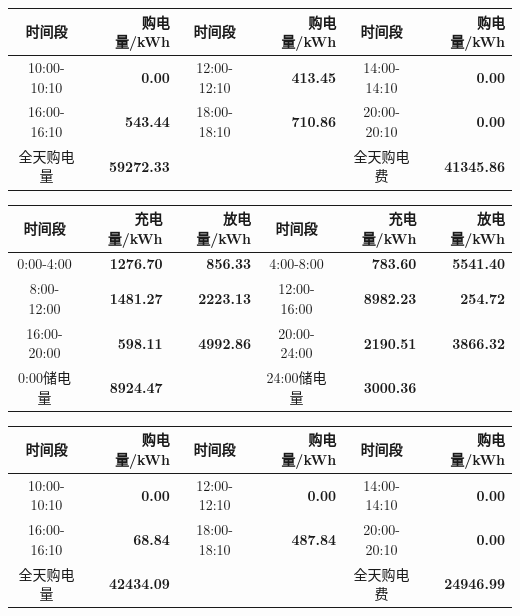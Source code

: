 {\setlength{\tabcolsep}{2pt}
\begin{center}
\begin{tabular}{|c|r|c|r|c|r|}
\hline
时间段 & 购电量/kWh & 时间段 & 购电量/kWh & 时间段 & 购电量/kWh \\
\hline10:00-10:10 & \textbf{0.00} & 12:00-12:10 & \textbf{413.45} & 14:00-14:10 & \textbf{0.00} \\
\hline16:00-16:10 & \textbf{543.44} & 18:00-18:10 & \textbf{710.86} & 20:00-20:10 & \textbf{0.00} \\
\hline
全天购电量 & \textbf{59272.33} & & & 全天购电费 & \textbf{41345.86} \\
\hline
\end{tabular}
\par{}

\vspace{0.15\baselineskip}
\begin{tabular}{|c|r|r|c|r|r|}
\hline
时间段 & 充电量/kWh & 放电量/kWh & 时间段 & 充电量/kWh & 放电量/kWh \\
\hline0:00-4:00 & \textbf{1276.70} & \textbf{856.33} & 4:00-8:00 & \textbf{783.60} & \textbf{5541.40} \\
\hline8:00-12:00 & \textbf{1481.27} & \textbf{2223.13} & 12:00-16:00 & \textbf{8982.23} & \textbf{254.72} \\
\hline16:00-20:00 & \textbf{598.11} & \textbf{4992.86} & 20:00-24:00 & \textbf{2190.51} & \textbf{3866.32} \\
\hline0:00储电量 & \textbf{8924.47} & & 24:00储电量 & \textbf{3000.36} & \\
\hline
\end{tabular}
\par{}

\vspace{0.15\baselineskip}
\begin{tabular}{|c|r|c|r|c|r|}
\hline
时间段 & 购电量/kWh & 时间段 & 购电量/kWh & 时间段 & 购电量/kWh \\
\hline10:00-10:10 & \textbf{0.00} & 12:00-12:10 & \textbf{0.00} & 14:00-14:10 & \textbf{0.00} \\
\hline16:00-16:10 & \textbf{68.84} & 18:00-18:10 & \textbf{487.84} & 20:00-20:10 & \textbf{0.00} \\
\hline
全天购电量 & \textbf{42434.09} & & & 全天购电费 & \textbf{24946.99} \\
\hline
\end{tabular}
\par{}


\end{center}}
